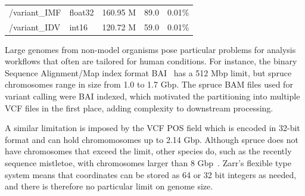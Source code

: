 \documentclass[a4paper,num-refs]{oup-contemporary}
\begin{document}
\begin{table}
\begin{tabular}{llS[table-format=3.2]S[table-format=3.2]S[table-format=3.2]}
/variant\_IMF & float32 & 160.95 M & 89.0 & 0.01\% \\
/variant\_IDV & int16 & 120.72 M & 59.0 & 0.01\% \\
\bottomrule
\end{tabular}
\end{table}

Large genomes from non-model organisms pose particular problems for
analysis workflows that often are tailored for human conditions. For
instance, the binary Sequence Alignment/Map index format
BAI~\cite{li2009sequence} has a 512
Mbp limit, but spruce chromosomes range in size from 1.0 to 1.7 Gbp.
The spruce BAM files used for variant calling were BAI indexed, which
motivated the partitioning into multiple VCF files in the first place,
adding complexity to downstream processing.

A similar limitation is imposed by the VCF POS field which is encoded
in 32-bit format and can hold chromomosomes up to 2.14 Gbp. Although
spruce does not have chromosomes that exceed the limit, other species
do, such as the recently sequence mistletoe, with chromosomes larger
than 8 Gbp~\cite{dtol_mistletoe}. Zarr's flexible type 
system means that coordinates can be stored as 64 or 32 bit integers
as needed, and there is therefore no particular limit on genome size.
\end{document}
